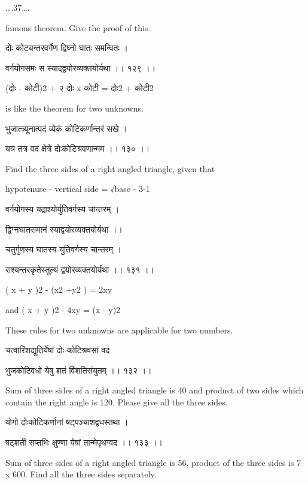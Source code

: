 \documentclass[]{article}
\date{}
\begin{document}
{\ldots{}.37\ldots{}.}

{famous theorem. Give the proof of this.}

{दोः कोट्यन्तरवर्गेण द्विघ्नो घातः समन्वितः । }

{वर्गयोगसमः स स्याद्द्वयोरव्यक्तयोर्यथा ।। १२९ ।। }

{(दोः - कोटी)}{2}{ + २ दोः x कोटी = दोः}{2}{ + कोटी}{2}

{is like the theorem for two unknowns.}

{भुजात्त्र्यूनात्पदं व्येकं कोटिकर्णान्तरं सखे । }

{यत्र तत्र वद क्षेत्रे दोःकोटिश्रवणान्मम ।। १३० ।।}

{Find the three sides of a right angled triangle, given that}

{hypotenuse - vertical side = }{√}{base - 3-1}

{वर्गयोगस्य यद्राश्योर्युतिवर्गस्य चान्तरम् । }

{द्वि}{ग्न}{घातसमानं स्याद्वयोरव्यक्तयोर्यथा ।। }

{चतुर्गुणस्य घातस्य युतिवर्गस्य चान्तरम् । }

{राश्यन्तरकृतेस्तुल्यं द्वयोरव्यक्तयोर्यथा ।। १३१ ।। }

{( x + y )}{2}{ - (x}{2}{ +y}{2}{ ) = 2xy}

{and ( x + y )}{2}{ - 4xy = (x - y)}{2}

{These rules for two unknowns are applicable for two numbers.}

{चत्वारिंशद्युतिर्येषां दोः कोटिश्रवसां वद}

{भुजकोटिवधो येषु शतं विंशतिसंयुतम् ।। १३२ ।। }

{Sum of three sides of a right angled triangle is 40 and product of two
sides which contain the right angle is 120. Please give all the three
sides.}

{योगो दोःकोटिकर्णानां षट्पञ्चाशद्वधस्तथा । }

{षट्शती सप्तभिः क्षुण्णा येषां तान्मेपृथग्वद ।। १३३ ।। }

{Sum of three sides of a right angled triangle is 56, product of the
three sides is 7 x 600. Find all the three sides separately.\\
}
\end{document}
